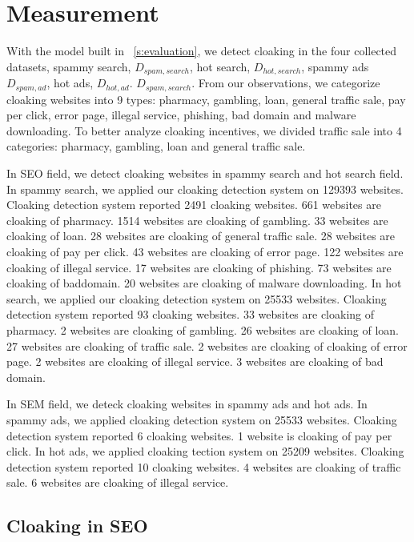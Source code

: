 \section{Measurement}
\label{s:measurement}

With the model built in ~\autoref{s:evaluation}, we detect cloaking in
the four collected datasets, spammy search, $D_{spam, search}$, hot search,
$D_{hot, search}$, spammy ads $D_{spam, ad}$, hot ads, $D_{hot, ad}$. 
$D_{spam, search}$. From our observations, we categorize cloaking websites into 9 types:
pharmacy, gambling, loan, general traffic sale, pay per click, error page, illegal service,
phishing, bad domain and malware downloading. To better analyze cloaking incentives, 
we divided traffic sale into 4 categories: pharmacy, gambling, loan and general traffic sale. 


In SEO field, we detect cloaking websites in spammy search and hot search field. In spammy search,
we applied our cloaking detection system on 129393 websites. Cloaking detection system reported 2491
cloaking websites. 661 websites are cloaking of pharmacy. 1514 websites are cloaking of gambling.
33 websites are cloaking of loan. 28 websites are cloaking of general traffic sale. 28 websites are cloaking
of pay per click. 43 websites are cloaking of error page. 122 websites are cloaking of illegal service. 
17 websites are cloaking of phishing. 73 websites are cloaking of baddomain. 20 websites are cloaking of malware downloading.
In hot search, we applied our cloaking detection system on 25533 websites. Cloaking detection system reported 93
cloaking websites. 33 websites are cloaking of pharmacy. 2 websites are cloaking of gambling.
26 websites are cloaking of loan. 27 websites are cloaking of traffic sale. 2 websites are cloaking of cloaking of
error page. 2 websites are cloaking of illegal service. 3 websites are cloaking of bad domain. 

In SEM field, we deteck cloaking websites in spammy ads and hot ads. In spammy ads,
we applied cloaking detection system on 25533 websites. Cloaking detection system reported 6 cloaking websites.
1 website is cloaking of pay per click. In hot ads, we applied cloaking tection system on 25209 websites.
Cloaking detection system reported 10 cloaking websites. 4 websites are cloaking of traffic sale.
6 websites are cloaking of illegal service. 



\subsection{Cloaking in SEO}


